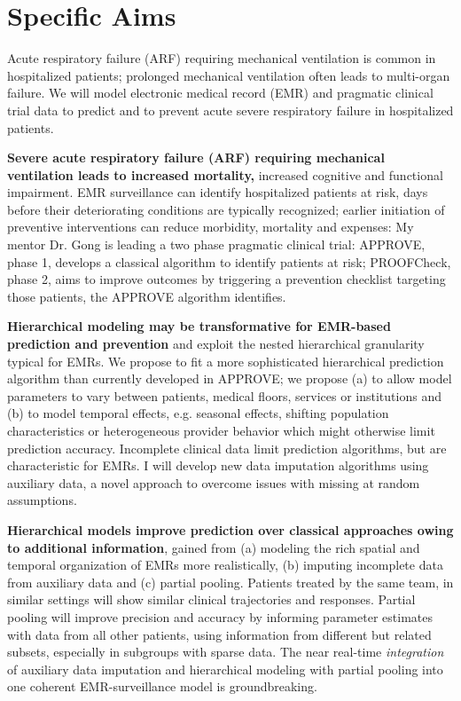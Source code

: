 \documentclass[11pt,notitlepage]{article}
\begin{document}
\part*{Specific Aims}
Acute respiratory failure (ARF) requiring mechanical ventilation is common in hospitalized patients; prolonged mechanical ventilation often leads to multi-organ failure. We will model electronic medical record (EMR) and pragmatic clinical trial data to predict and to prevent acute severe respiratory failure in hospitalized patients.

\textbf{Severe acute respiratory failure (ARF) requiring mechanical ventilation leads to increased mortality,} increased cognitive and functional impairment. EMR surveillance can identify hospitalized patients at risk, days before their deteriorating conditions are typically recognized; earlier initiation of preventive interventions can reduce morbidity, mortality and expenses: My mentor Dr. Gong is leading a two phase pragmatic clinical trial: APPROVE, phase 1, develops a classical algorithm to identify patients at risk; PROOFCheck, phase 2, aims to improve outcomes by triggering a prevention checklist targeting those patients, the APPROVE algorithm identifies. 

\textbf{Hierarchical modeling may be transformative for EMR-based prediction and prevention} and exploit the nested hierarchical granularity typical for EMRs. We propose to fit a more sophisticated hierarchical prediction algorithm than currently developed in APPROVE; we propose (a) to allow model parameters to vary between patients, medical floors, services or institutions and (b) to model temporal effects, e.g. seasonal effects, shifting population characteristics or heterogeneous provider behavior which might otherwise limit prediction accuracy. Incomplete clinical data limit prediction algorithms, but are characteristic for EMRs. I will develop new data imputation algorithms using auxiliary data, a novel approach to overcome issues with missing at random assumptions. 

\textbf{Hierarchical models improve prediction over classical approaches owing to additional information}, gained from (a) modeling the rich spatial and temporal organization of EMRs more realistically, (b) imputing incomplete data from auxiliary data and (c) partial pooling. Patients treated by the same team, in similar settings will show similar clinical trajectories and responses. Partial pooling will improve precision and accuracy by informing parameter estimates with data from all other patients, using information from different but related subsets, especially in subgroups with sparse data. The near real-time \textit{integration} of auxiliary data imputation and hierarchical modeling with partial pooling into one coherent EMR-surveillance model is groundbreaking. 
\end{document}
